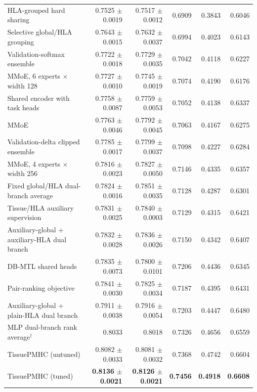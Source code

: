 \begin{table}[tbp]
\begin{tabularx}{\textwidth}{>{\raggedright\arraybackslash}Xrrrrr}
HLA-grouped hard sharing & 0.7525 $\pm$ 0.0019 & 0.7517 $\pm$ 0.0012 & 0.6909 & 0.3843 & 0.6046 \\
Selective global/HLA grouping & 0.7643 $\pm$ 0.0015 & 0.7632 $\pm$ 0.0037 & 0.6994 & 0.4023 & 0.6143 \\
Validation-softmax ensemble & 0.7722 $\pm$ 0.0018 & 0.7729 $\pm$ 0.0035 & 0.7042 & 0.4118 & 0.6227 \\
MMoE, 6 experts $\times$ width 128 & 0.7727 $\pm$ 0.0010 & 0.7745 $\pm$ 0.0019 & 0.7074 & 0.4190 & 0.6176 \\
Shared encoder with task heads & 0.7758 $\pm$ 0.0087 & 0.7759 $\pm$ 0.0053 & 0.7052 & 0.4138 & 0.6337 \\
MMoE & 0.7763 $\pm$ 0.0046 & 0.7792 $\pm$ 0.0045 & 0.7063 & 0.4167 & 0.6275 \\
Validation-delta clipped ensemble & 0.7785 $\pm$ 0.0017 & 0.7799 $\pm$ 0.0037 & 0.7098 & 0.4227 & 0.6284 \\
MMoE, 4 experts $\times$ width 256 & 0.7816 $\pm$ 0.0023 & 0.7827 $\pm$ 0.0050 & 0.7146 & 0.4335 & 0.6357 \\
Fixed global/HLA dual-branch average & 0.7824 $\pm$ 0.0016 & 0.7851 $\pm$ 0.0035 & 0.7128 & 0.4287 & 0.6301 \\
Tissue/HLA auxiliary supervision & 0.7831 $\pm$ 0.0025 & 0.7840 $\pm$ 0.0003 & 0.7129 & 0.4315 & 0.6421 \\
Auxiliary-global + auxiliary-HLA dual branch & 0.7832 $\pm$ 0.0028 & 0.7836 $\pm$ 0.0026 & 0.7150 & 0.4342 & 0.6407 \\
DB-MTL shared heads & 0.7835 $\pm$ 0.0073 & 0.7800 $\pm$ 0.0101 & 0.7206 & 0.4436 & 0.6345 \\
Pair-ranking objective & 0.7841 $\pm$ 0.0030 & 0.7825 $\pm$ 0.0034 & 0.7187 & 0.4395 & 0.6431 \\
Auxiliary-global + plain-HLA dual branch & 0.7911 $\pm$ 0.0038 & 0.7916 $\pm$ 0.0054 & 0.7203 & 0.4447 & 0.6480 \\
MLP dual-branch rank average$^\dagger$ & 0.8033 & 0.8018 & 0.7326 & 0.4656 & 0.6559 \\
TissuePMHC (untuned) & 0.8082 $\pm$ 0.0033 & 0.8081 $\pm$ 0.0032 & 0.7368 & 0.4742 & 0.6604 \\
TissuePMHC (tuned) & \textbf{0.8136 $\pm$ 0.0021} & \textbf{0.8126 $\pm$ 0.0021} & \textbf{0.7456} & \textbf{0.4918} & \textbf{0.6608} \\
\bottomrule
\end{tabularx}
\end{table}

